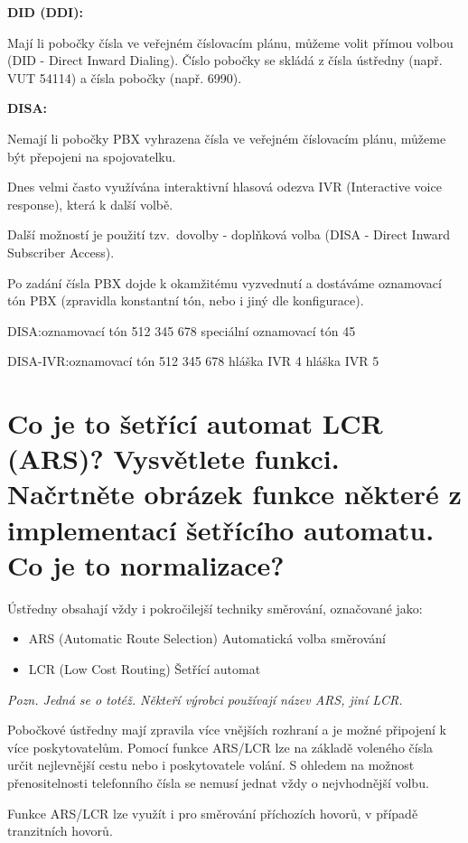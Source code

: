\textbf{DID (DDI):}

Mají li pobočky čísla ve veřejném číslovacím plánu, můžeme volit přímou volbou (DID - Direct Inward Dialing). Číslo pobočky se skládá z čísla ústředny (např. VUT 54114) a čísla pobočky (např. 6990).

\noindent\textbf{DISA:}

Nemají li pobočky PBX vyhrazena čísla ve veřejném číslovacím plánu, můžeme být přepojeni na spojovatelku.

Dnes velmi často využívána interaktivní hlasová odezva IVR (Interactive voice response), která  k další volbě.

Další možností je použití tzv.\ dovolby - doplňková volba (DISA - Direct Inward Subscriber Access).

Po zadání čísla PBX dojde k okamžitému vyzvednutí a dostáváme oznamovací tón PBX (zpravidla konstantní tón, nebo i jiný dle konfigurace).

DISA:\@ oznamovací tón 512 345 678 speciální oznamovací tón 45

DISA-IVR:\@ oznamovací tón 512 345 678 hláška IVR 4 hláška IVR 5

\section{Co je to šetřící automat LCR (ARS)? Vysvětlete funkci. Načrtněte obrázek funkce některé z implementací šetřícího automatu. Co je to normalizace?}

Ústředny obsahají vždy i pokročilejší techniky směrování, označované jako:
\begin{itemize}[noitemsep]
    \item ARS (Automatic Route Selection) Automatická volba směrování
    \item LCR (Low Cost Routing) Šetřící automat
\end{itemize}

\emph{Pozn. Jedná se o totéž. Někteří výrobci používají název ARS, jiní LCR.}

Pobočkové ústředny mají zpravila více vnějších rozhraní a je možné připojení k více poskytovatelům. Pomocí funkce ARS/LCR lze na základě voleného čísla určit nejlevnější cestu nebo i poskytovatele volání. S ohledem na možnost přenositelnosti telefonního čísla se nemusí jednat vždy o nejvhodnější volbu.

Funkce ARS/LCR lze využít i pro směrování příchozích hovorů, v případě tranzitních hovorů.

